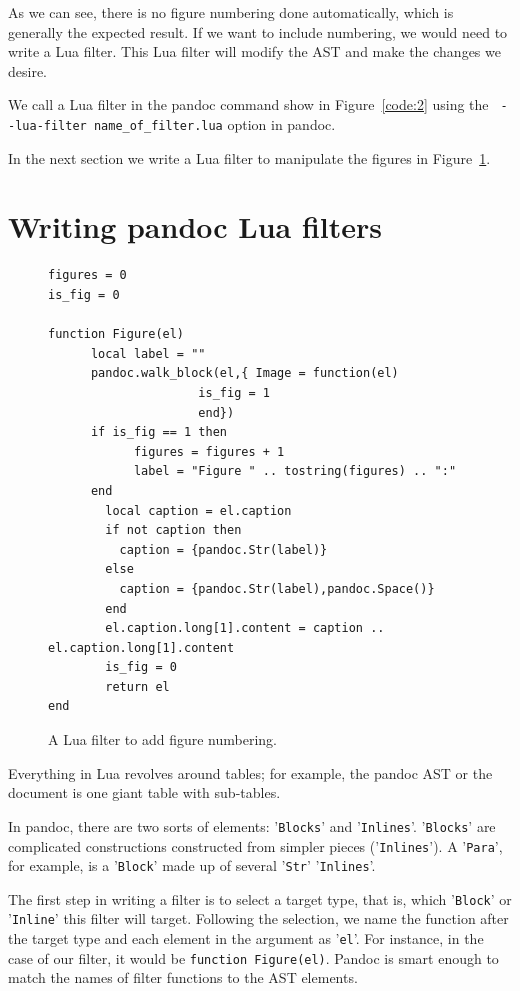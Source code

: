As we can see, there is no figure numbering done automatically, which is generally
the expected result. If we want to include numbering, we would need
to write a Lua filter. This Lua filter will modify the AST and make the changes we 
desire.

We call a Lua filter in the pandoc command show in Figure~\ref{code:2} using the \verb| --lua-filter name_of_filter.lua|
option in pandoc.

In the next section we write a Lua filter to manipulate the figures in Figure~\ref{code:3}.

\section{Writing pandoc Lua filters}

\begin{figure}[htbp]
\begin{verbatim}
figures = 0
is_fig = 0

function Figure(el)
      local label = ""
      pandoc.walk_block(el,{ Image = function(el)
                     is_fig = 1
                     end})
      if is_fig == 1 then
	        figures = figures + 1
	        label = "Figure " .. tostring(figures) .. ":"
      end
	    local caption = el.caption
	    if not caption then
          caption = {pandoc.Str(label)}
    	else
          caption = {pandoc.Str(label),pandoc.Space()}
    	end
    	el.caption.long[1].content = caption .. el.caption.long[1].content
    	is_fig = 0
    	return el
end
\end{verbatim}
\caption{A Lua filter to add figure numbering.}
\label{code:3}
\end{figure}

Everything in Lua revolves around tables; for example, the pandoc AST or the document is one giant table with sub-tables.

In pandoc, there are two sorts of elements: '\verb|Blocks|' and '\verb|Inlines|'. '\verb|Blocks|' are complicated constructions constructed from simpler pieces ('\verb|Inlines|'). A '\verb|Para|', for example, is a '\verb|Block|' made up of several '\verb|Str|' '\verb|Inlines|'.

The first step in writing a filter is to select a target type, that is, which '\verb|Block|' or '\verb|Inline|' this filter will target.
Following the selection, we name the function after the target type and each element in the argument as '\verb|el|'.
For instance, in the case of our filter, it would be \verb|function Figure(el)|. Pandoc is smart enough to match the names of filter functions to the AST elements.

